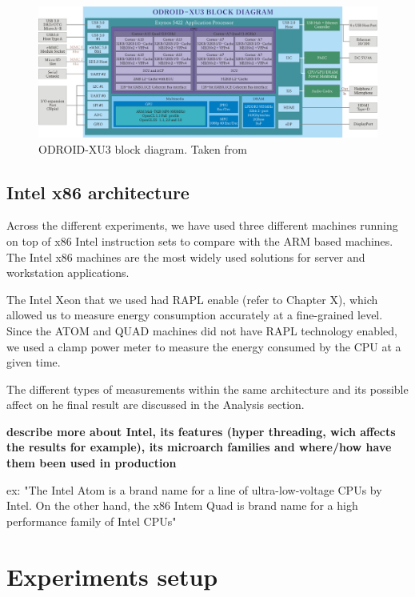 \begin{figure}[h!]
  \centering
    \includegraphics[width=\textwidth]{"img/odroidxu3-diagram"}
    \caption{ODROID-XU3 block diagram. Taken from \cite{ODROID_XU3}}
    \label{fig:odroidxu3-diagram}
\end{figure}


\subsection{Intel x86 architecture}

Across the different experiments, we have used three different machines running
on top of x86 Intel instruction sets to
compare with the ARM based machines. The Intel x86 machines are the most widely
used solutions for server and workstation applications.

The Intel Xeon that we used had RAPL enable (refer to Chapter X), which allowed us to measure energy
consumption accurately at a fine-grained level. Since the ATOM and QUAD machines
did not have RAPL technology enabled, we used a clamp power meter to measure the
energy consumed by the CPU at a given time.

The different types of measurements within the same architecture and
its possible affect on he final result are discussed in the Analysis section.

\textbf{describe more about Intel, its features (hyper threading, wich affects the results for example), its microarch families and where/how have them been used in production}

ex: "The Intel Atom is a brand name for a line of ultra-low-voltage CPUs by Intel. On the other hand, the x86 Intem Quad is brand name for a high performance family of Intel CPUs"

\clearpage


\section{Experiments setup}
